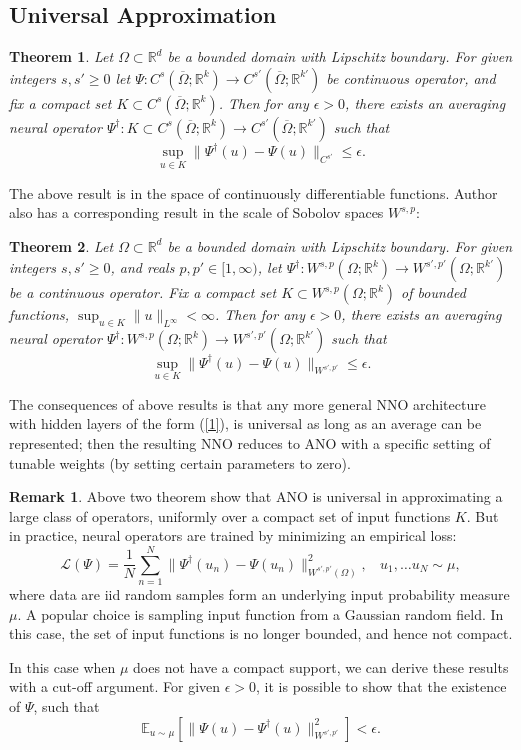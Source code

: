 \documentclass[reqno,9pt]{amsart}
\theoremstyle{plain}
\newtheorem{thm}{Theorem}
\theoremstyle{definition}
\newtheorem{rem}{Remark}
\newcommand{\bb}[1]{\mathbb{#1}}
\newcommand{\cal}[1]{\mathcal{#1}}
\begin{document}
\subsection{\bf Universal Approximation}
\begin{thm}\label{thm2.1}
    Let $\Omega \subset \bb R^d$ be a bounded domain with Lipschitz boundary. For given integers $s,s' \geq 0$ let $\Psi : C^s(\overline{\Omega};\bb R^k) \to C^{s'}(\overline{\Omega};\bb R^{k'})$ be continuous operator, and fix a compact set $K \subset C^s(\overline{\Omega};\bb R^k)$. Then for any $\epsilon > 0$, there exists an averaging neural operator $\Psi^\dag : K \subset C^s(\overline{\Omega};\bb R^k) \to C^{s'}(\overline{\Omega};\bb R^{k'})$ such that 
    $$ \sup\limits_{u \in K}\|\Psi^\dag (u) - \Psi(u)\|_{C^{s'}} \leq \epsilon.$$ 
\end{thm}
The above result is in the space of continuously differentiable functions. Author also has a corresponding result in the scale of Sobolov spaces $W^{s,p}$:
\begin{thm} \label{thm2.2}
    Let $\Omega \subset \bb R^d$ be a bounded domain with Lipschitz boundary. For given integers $s,s'\geq 0$, and reals $p,p' \in [1,\infty)$, let $\Psi^\dag: W^{s,p}(\Omega;\bb R^k) \to W^{s',p'}(\Omega;\bb R^{k'})$ be a continuous operator. Fix a compact set $K \subset W^{s,p}(\Omega;\bb R^k)$ of bounded functions, $\sup_{u \in K}\|u\|_{L^\infty} < \infty$. Then for any $\epsilon > 0$, there exists an averaging neural operator $\Psi^\dag:W^{s,p}(\Omega;\bb R^k) \to W^{s',p'}(\Omega;\bb R^{k'})$ such that 
    $$ \sup\limits_{u\in K}\|\Psi^\dag(u) - \Psi(u)\|_{W^{s',p'}} \leq \epsilon.$$
\end{thm}
The consequences of above results is that any more general NNO architecture with hidden layers of the form (\ref{1}), is universal as long as an average can be represented; then the resulting NNO reduces to ANO with a specific setting of tunable weights (by setting certain parameters to zero).
\begin{rem}
    Above two theorem show that ANO is universal in approximating a large class of operators, uniformly over a compact set of input functions $K$. But in practice, neural operators are trained by minimizing an empirical loss:
    $$ \cal L(\Psi) = \frac{1}{N} \sum\limits_{n=1}^{N} \|\Psi^\dag(u_n) - \Psi(u_n)\|^2_{W^{s',p'}(\Omega)},~~~~u_1, \dots u_N \sim \mu,$$
    where data are iid random samples form an underlying input probability measure $\mu$. A popular choice is sampling input function from a Gaussian random field. In this case, the set of input functions is no longer bounded, and hence not compact.

    \noindent In this case when $\mu$ does not have a compact support, we can derive these results with a cut-off argument. For given $\epsilon > 0$, it is possible to show that the existence of $\Psi$, such that 
    $$ \bb E_{u\sim\mu}[\|\Psi(u) - \Psi^\dag(u)\|^2_{W^{s',p'}}] < \epsilon.$$
\end{rem}
\end{document}
